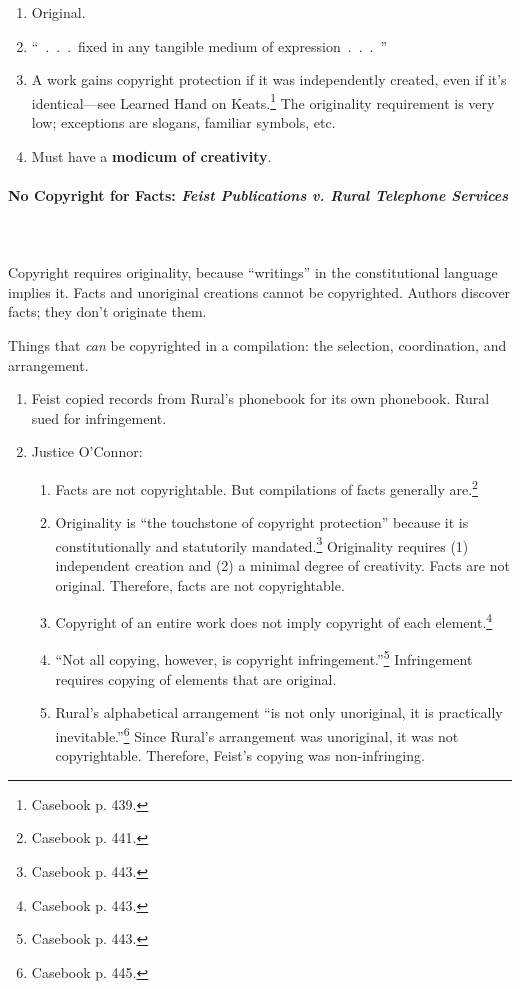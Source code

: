 \begin{enumerate}
    \item Original.
    \item ``~.~.~.~fixed in any tangible medium of expression~.~.~.~''
    \item A work gains copyright protection if it was independently created, 
    even if it's identical---see Learned Hand on Keats.\footnote{Casebook p. 
    439.} The originality requirement is very low; exceptions are slogans, 
    familiar symbols, etc.
    \item Must have a \textbf{modicum of creativity}.
\end{enumerate}

\paragraph{No Copyright for Facts: \emph{Feist Publications v. Rural Telephone 
Services}}
~\\\\
Copyright requires originality, because ``writings'' in the constitutional 
language implies it. Facts and unoriginal creations cannot be copyrighted. 
Authors discover facts; they don't originate them. 

Things that \emph{can} be copyrighted in a compilation: the selection, 
coordination, and arrangement.

\begin{enumerate}
    \item Feist copied records from Rural's phonebook for its own phonebook. 
    Rural sued for infringement.
    \item Justice O'Connor:
    \begin{enumerate}
        \item Facts are not copyrightable. But compilations of facts generally 
        are.\footnote{Casebook p. 441.}
        \item Originality is ``the touchstone of copyright 
        protection'' because it is constitutionally and statutorily 
        mandated.\footnote{Casebook p. 443.} Originality requires (1) 
        independent creation and (2) a minimal degree of creativity.  
        Facts are not original. Therefore, facts are not copyrightable.
        \item Copyright of an entire work does not imply copyright of each 
        element.\footnote{Casebook p. 443.}
        \item ``Not all copying, however, is copyright 
        infringement.''\footnote{Casebook p. 443.} Infringement requires 
        copying of elements that are original. 
        \item Rural's alphabetical arrangement ``is not only unoriginal, it is 
        practically inevitable.''\footnote{Casebook p. 445.} Since Rural's 
        arrangement was unoriginal, it was not copyrightable. Therefore, 
        Feist's copying was non-infringing.
    \end{enumerate}
\end{enumerate}

